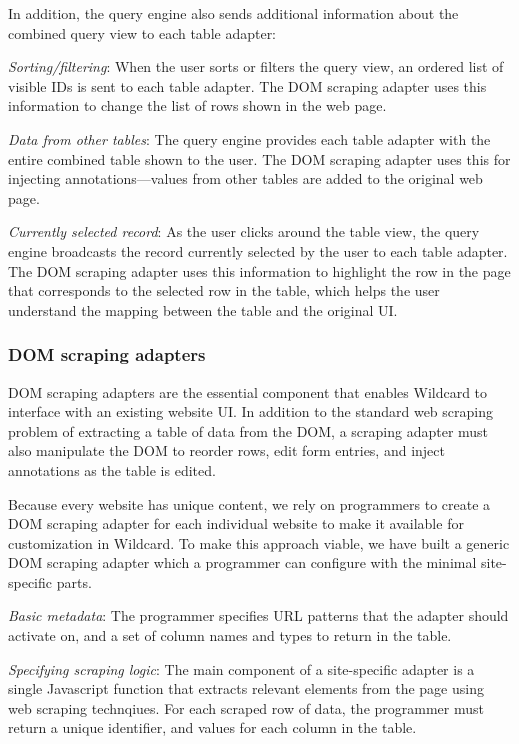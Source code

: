 \documentclass[sigplan,screen,10pt,anonymous,review]{acmart}
\begin{document}
In addition, the query engine also sends additional information about
the combined query view to each table adapter:

\emph{Sorting/filtering}: When the user sorts or filters the query view,
an ordered list of visible IDs is sent to each table adapter. The DOM
scraping adapter uses this information to change the list of rows shown
in the web page.

\emph{Data from other tables}: The query engine provides each table
adapter with the entire combined table shown to the user. The DOM
scraping adapter uses this for injecting annotations---values from other
tables are added to the original web page.

\emph{Currently selected record}: As the user clicks around the table
view, the query engine broadcasts the record currently selected by the
user to each table adapter. The DOM scraping adapter uses this
information to highlight the row in the page that corresponds to the
selected row in the table, which helps the user understand the mapping
between the table and the original UI.

\hypertarget{dom-scraping-adapters}{%
\subsubsection{DOM scraping adapters}\label{dom-scraping-adapters}}

DOM scraping adapters are the essential component that enables Wildcard
to interface with an existing website UI. In addition to the standard
web scraping problem of extracting a table of data from the DOM, a
scraping adapter must also manipulate the DOM to reorder rows, edit form
entries, and inject annotations as the table is edited.

Because every website has unique content, we rely on programmers to
create a DOM scraping adapter for each individual website to make it
available for customization in Wildcard. To make this approach viable,
we have built a generic DOM scraping adapter which a programmer can
configure with the minimal site-specific parts.

\emph{Basic metadata}: The programmer specifies URL patterns that the
adapter should activate on, and a set of column names and types to
return in the table.

\emph{Specifying scraping logic}: The main component of a site-specific
adapter is a single Javascript function that extracts relevant elements
from the page using web scraping technqiues. For each scraped row of
data, the programmer must return a unique identifier, and values for
each column in the table.
\end{document}
